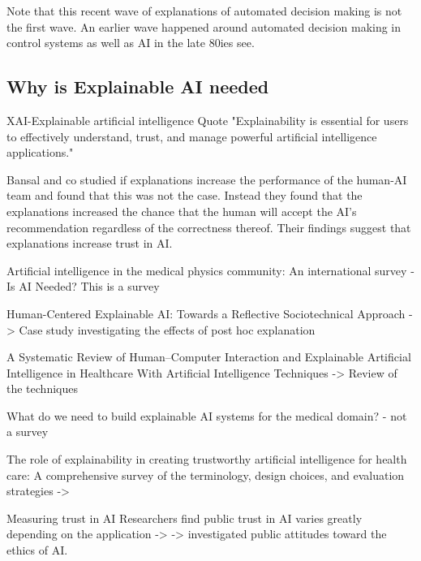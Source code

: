 \documentclass[manuscript,screen,review]{acmart}
\begin{document}
Note that this recent wave of explanations of automated decision making is not the first wave. 
An earlier wave happened around automated decision making in control systems as well as AI in the late 80ies see\cite{Chandrasekaran1989}.

\subsection{Why is Explainable AI needed}
XAI-Explainable artificial intelligence\cite{Gunning2019} Quote "Explainability is essential for users to effectively understand, trust, and manage powerful artificial intelligence applications."

Bansal and co studied if explanations increase the performance of the human-AI team and found that this was not the case.
Instead they found that the explanations increased the chance that the human will accept the AI's recommendation regardless of
the correctness thereof.
Their findings suggest that explanations increase trust in AI.\cite{Bansal2020}

Artificial intelligence in the medical physics community: An international survey - Is AI Needed? This is a survey

Human-Centered Explainable AI: Towards a Reflective Sociotechnical Approach -> Case study investigating the effects of post hoc explanation

A Systematic Review of Human–Computer Interaction and Explainable Artificial Intelligence in Healthcare With Artificial Intelligence Techniques -> Review of the techniques

What do we need to build explainable AI systems for the medical domain?  - not a survey

The role of explainability in creating trustworthy artificial intelligence for health care: A comprehensive survey of the terminology, design choices, and evaluation strategies -> 

Measuring trust in AI
Researchers find public trust in AI varies greatly depending on the application -> %
-> investigated public attitudes toward the ethics of AI.
\end{document}
